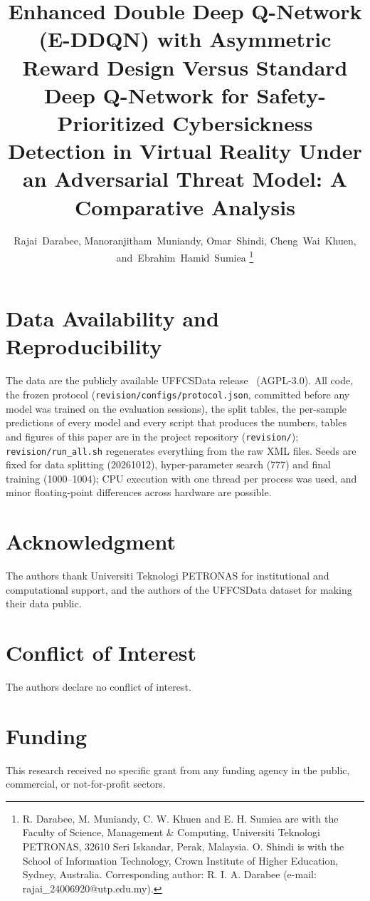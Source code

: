 \documentclass[journal]{IEEEtran}
\begin{document}
\title{Enhanced Double Deep Q-Network (E-DDQN) with Asymmetric Reward Design Versus Standard Deep Q-Network for Safety-Prioritized Cybersickness Detection in Virtual Reality Under an Adversarial Threat Model: A Comparative Analysis}

\author{Rajai~Darabee,
        Manoranjitham~Muniandy,
        Omar~Shindi,
        Cheng~Wai~Khuen,
        and~Ebrahim~Hamid~Sumiea
\thanks{R. Darabee, M. Muniandy, C. W. Khuen and E. H. Sumiea are with the Faculty of Science, Management \& Computing, Universiti Teknologi PETRONAS, 32610 Seri Iskandar, Perak, Malaysia. O. Shindi is with the School of Information Technology, Crown Institute of Higher Education, Sydney, Australia. Corresponding author: R. I. A. Darabee (e-mail: rajai\_24006920@utp.edu.my).}}

\maketitle










\section*{Data Availability and Reproducibility}
The data are the publicly available UFFCSData release~\cite{porcino2019uffcsdata} (AGPL-3.0). All code, the frozen protocol (\texttt{revision/\allowbreak configs/\allowbreak protocol.json}, committed before any model was trained on the evaluation sessions), the split tables, the per-sample predictions of every model and every script that produces the numbers, tables and figures of this paper are in the project repository (\texttt{revision/\allowbreak }); \texttt{revision/\allowbreak run\_all.sh} regenerates everything from the raw XML files. Seeds are fixed for data splitting (20261012), hyper-parameter search (777) and final training (1000--1004); CPU execution with one thread per process was used, and minor floating-point differences across hardware are possible.

\section*{Acknowledgment}
The authors thank Universiti Teknologi PETRONAS for institutional and computational support, and the authors of the UFFCSData dataset for making their data public.

\section*{Conflict of Interest}
The authors declare no conflict of interest.

\section*{Funding}
This research received no specific grant from any funding agency in the public, commercial, or not-for-profit sectors.



\end{document}
